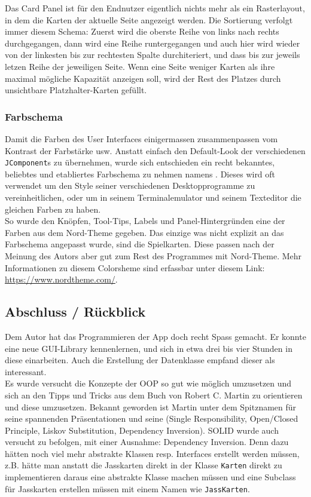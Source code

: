\documentclass[a4paper,11pt]{article}
\begin{document}
Das Card Panel ist für den Endnutzer eigentlich nichts mehr als ein Rasterlayout, in dem die Karten der aktuelle Seite angezeigt werden. Die Sortierung verfolgt immer diesem Schema: Zuerst wird die oberste Reihe von links nach rechts durchgegangen, dann wird eine Reihe runtergegangen und auch hier wird wieder von der linkesten bis zur rechtesten Spalte durchiteriert, und dass bis zur jeweils letzen Reihe der jeweiligen Seite. Wenn eine Seite weniger Karten als ihre maximal mögliche Kapazität anzeigen soll, wird der Rest des Platzes durch unsichtbare Platzhalter-Karten gefüllt.

\subsubsection{Farbschema}

Damit die Farben des User Interfaces einigermassen zusammenpassen vom Kontrast der Farbstärke usw. Anstatt einfach den Default-Look der verschiedenen \texttt{JComponent}s zu übernehmen, wurde sich entschieden ein recht bekanntes, beliebtes und etabliertes Farbschema zu nehmen namens . Dieses wird oft verwendet um den Style seiner verschiedenen Desktopprogramme zu vereinheitlichen, oder um in seinem Terminalemulator und seinem Texteditor die gleichen Farben zu haben.\\

So wurde den Knöpfen, Tool-Tips, Labels und Panel-Hintergründen eine der Farben aus dem Nord-Theme gegeben. Das einzige was nicht explizit an das Farbschema angepasst wurde, sind die Spielkarten. Diese passen nach der Meinung des Autors aber gut zum Rest des Programmes mit Nord-Theme. Mehr Informationen zu diesem Colorsheme sind erfassbar unter diesem Link: \url{https://www.nordtheme.com/}.

\subsection{Abschluss / Rückblick}

Dem Autor hat das Programmieren der App doch recht Spass gemacht. Er konnte eine neue GUI-Library kennenlernen, und sich in etwa drei bis vier Stunden in diese einarbeiten. Auch die Erstellung der Datenklasse empfand dieser als interessant.\\

Es wurde versucht die Konzepte der OOP so gut wie möglich umzusetzen und sich an den Tipps und Tricks aus dem Buch  von Robert C. Martin zu orientieren und diese umzusetzen. Bekannt geworden ist Martin unter dem Spitznamen  für seine spannenden Präsentationen und seine  (Single Responsibility, Open/Closed Principle, Liskov Substitution, Dependency Inversion). SOLID wurde auch versucht zu befolgen, mit einer Ausnahme: Dependency Inversion. Denn dazu hätten noch viel mehr abstrakte Klassen resp. Interfaces erstellt werden müssen, z.B. hätte man anstatt die Jasskarten direkt in der Klasse \texttt{Karten} direkt zu implementieren daraus eine abstrakte Klasse machen müssen und eine Subclass für Jasskarten erstellen müssen mit einem Namen wie \texttt{JassKarten}.\\
\end{document}
